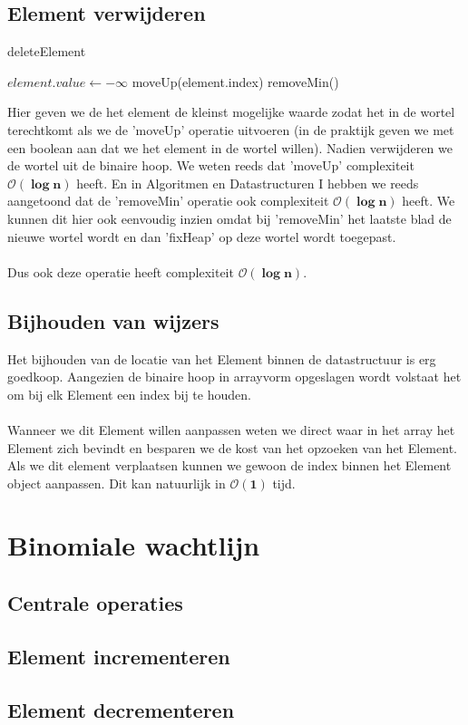 \documentclass[a4paper,12pt]{report}
\newcommand{\bigO}[1]{$\bm{\mathcal{O}(#1)}$} %
\begin{document}
\subsection{Element verwijderen}
\begin{algorithm}[H]
\caption{deleteElement}
\SetAlgoLined	
\DontPrintSemicolon
$element.value \gets -\infty$\;
moveUp(element.index)\;	
removeMin()\;
\end{algorithm}
Hier geven we de het element de kleinst mogelijke waarde zodat het in de wortel terechtkomt als we de 'moveUp' operatie uitvoeren (in de praktijk geven we met een boolean aan dat we het element in de wortel willen). Nadien verwijderen we de wortel uit de binaire hoop. We weten reeds dat 'moveUp' complexiteit \bigO{\log n} heeft. En in Algoritmen en Datastructuren I hebben we reeds aangetoond dat de 'removeMin' operatie ook complexiteit \bigO{\log n} heeft. We kunnen dit hier ook eenvoudig inzien omdat bij 'removeMin' het laatste blad de nieuwe wortel wordt en dan 'fixHeap' op deze wortel wordt toegepast. \\ \\
Dus ook deze operatie heeft complexiteit \bigO{\log n}.
\subsection{Bijhouden van wijzers}
Het bijhouden van de locatie van het Element binnen de datastructuur is erg goedkoop. Aangezien de binaire hoop in arrayvorm opgeslagen wordt volstaat het om bij elk Element een index bij te houden. \\ \\
Wanneer we dit Element willen aanpassen weten we direct waar in het array het Element zich bevindt en besparen we de kost van het opzoeken van het Element. Als we dit element verplaatsen kunnen we gewoon de index binnen het Element object aanpassen. Dit kan natuurlijk in \bigO{1} tijd. 
\section{Binomiale wachtlijn} %
\subsection{Centrale operaties}
\subsection{Element incrementeren}
\subsection{Element decrementeren}
\end{document}
